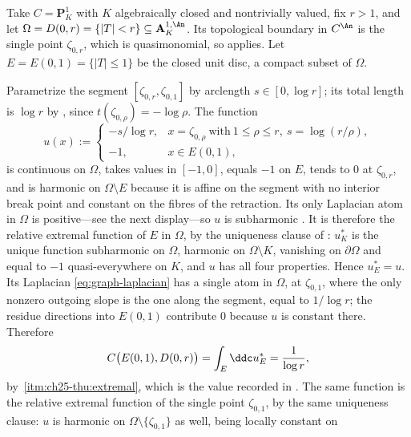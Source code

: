 \begin{example}
\label{ex:ch25-thuillier-disc}
Take \(C=\mathbf P^1_K\) with \(K\) algebraically closed and nontrivially
valued, fix \(r>1\), and let
\(\Omega=D(0,r)=\{|T|<r\}\subseteq\mathbf A^{1,\An}_K\).  Its topological
boundary in \(C^{\An}\) is the single point \(\zeta_{0,r}\), which is
quasimonomial, so  applies.  Let
\(E=E(0,1)=\{|T|\leq1\}\) be the closed unit disc, a compact subset of
\(\Omega\).

Parametrize the segment \([\zeta_{0,r},\zeta_{0,1}]\) by arclength
\(s\in[0,\log r]\); its total length is \(\log r\) by
, since \(t(\zeta_{0,\rho})=-\log\rho\).  The
function
\[
 u(x):=
 \begin{cases}
  -s/\log r,&x=\zeta_{0,\rho}\ \text{with}\ 1\leq\rho\leq r,\ s=\log(r/\rho),\\
  -1,&x\in E(0,1),
 \end{cases}
\]
is continuous on \(\Omega\), takes values in \([-1,0]\), equals \(-1\) on
\(E\), tends to \(0\) at \(\zeta_{0,r}\), and is harmonic on
\(\Omega\setminus E\) because it is affine on the segment with no interior
break point and constant on the fibres of the retraction.  Its only
Laplacian atom in \(\Omega\) is positive---see the next display---so \(u\) is
subharmonic \cite[Th\'eor\`eme~3.4.12]{Thu05}.  It is therefore the relative
extremal function of \(E\) in \(\Omega\), by the uniqueness clause of
\cite[Th\'eor\`eme~3.6.13]{Thu05}: \(u^*_K\) is the unique function
subharmonic on \(\Omega\), harmonic on \(\Omega\setminus K\), vanishing on
\(\partial\Omega\) and equal to \(-1\) quasi-everywhere on \(K\), and \(u\)
has all four properties.  Hence \(u^*_E=u\).  Its Laplacian
\eqref{eq:graph-laplacian} has a single atom in \(\Omega\), at
\(\zeta_{0,1}\), where the only nonzero outgoing slope is the one along the
segment, equal to \(1/\log r\); the residue directions into \(E(0,1)\)
contribute \(0\) because \(u\) is constant there.  Therefore
\begin{equation}
\label{eq:ch25-thuillier-disc}
 C\bigl(E(0,1),D(0,r)\bigr)=\int_E\ddc u^*_E=\frac1{\log r},
\end{equation}
by \,\cref{itm:ch25-thu:extremal}, which is
the value recorded in \cite[Remarque~3.6.12]{Thu05}.  The same function is
the relative extremal function of the single point \(\zeta_{0,1}\), by the
same uniqueness clause: \(u\) is harmonic on
\(\Omega\setminus\{\zeta_{0,1}\}\) as well, being locally constant on

\end{example}
